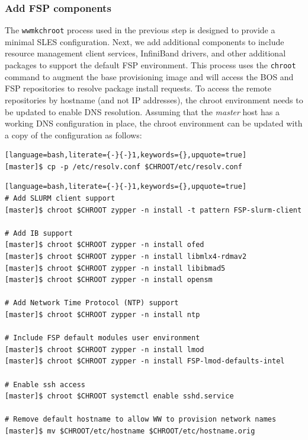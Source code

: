 \documentclass[letterpaper]{article}
\begin{document}
\subsubsection{Add FSP components}

The \texttt{wwmkchroot} process used in the previous step is designed to
provide a minimal SLES configuration. Next, we add additional components to
include resource management client services, InfiniBand drivers, and other
additional packages to support the default FSP environment.  This process uses
the \texttt{chroot} command to augment the base provisioning image and will
access the BOS and FSP repositories to resolve package install requests. To
access the remote repositories by hostname (and not IP addresses), the chroot
environment needs to be updated to enable DNS resolution. Assuming that
the {\em master} host has a working DNS configuration in place, the chroot environment can
be updated with a copy of the configuration as follows:

\begin{lstlisting}[language=bash,literate={-}{-}1,keywords={},upquote=true]
[master]$ cp -p /etc/resolv.conf $CHROOT/etc/resolv.conf
\end{lstlisting}


\begin{lstlisting}[language=bash,literate={-}{-}1,keywords={},upquote=true]
# Add SLURM client support
[master]$ chroot $CHROOT zypper -n install -t pattern FSP-slurm-client

# Add IB support
[master]$ chroot $CHROOT zypper -n install ofed
[master]$ chroot $CHROOT zypper -n install libmlx4-rdmav2
[master]$ chroot $CHROOT zypper -n install libibmad5
[master]$ chroot $CHROOT zypper -n install opensm

# Add Network Time Protocol (NTP) support
[master]$ chroot $CHROOT zypper -n install ntp

# Include FSP default modules user environment
[master]$ chroot $CHROOT zypper -n install lmod 
[master]$ chroot $CHROOT zypper -n install FSP-lmod-defaults-intel

# Enable ssh access 
[master]$ chroot $CHROOT systemctl enable sshd.service

# Remove default hostname to allow WW to provision network names
[master]$ mv $CHROOT/etc/hostname $CHROOT/etc/hostname.orig
\end{lstlisting}
\end{document}
